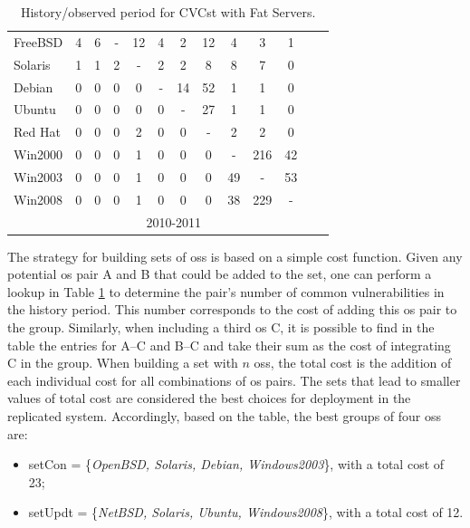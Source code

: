\begin{table}[!ht]
\begin{center}
{\begin{tabular}{|l|c|c|c|c|c|c|c|c|c|c|c|c|}
FreeBSD & 4 & 6 & - & 12 & 4 & 2 & 12 & 4 & 3 & 1& \\ \cline{1-11}
Solaris & 1 & 1 & 2 & - & 2 & 2 & 8 & 8 & 7 & 0 &\\ \cline{1-11}
Debian & 0 & 0 & 0 & 0 & - & 14 & 52 & 1 & 1 & 0 &\\ \cline{1-11}
Ubuntu & 0 & 0 & 0 & 0 & 0 & - & 27 & 1 & 1 & 0 &\\ \cline{1-11}
Red Hat & 0 & 0 & 0 & 2 & 0 & 0 & - & 2 & 2 & 0 &\\ \cline{1-11}
Win2000 & 0 & 0 & 0 & 1 & 0 & 0 & 0 & - & 216 & 42 &\\ \cline{1-11}
Win2003 & 0 & 0 & 0 & 1 & 0 & 0 & 0 & 49 & - & 53 & \\ \cline{1-12}
Win2008 & 0 & 0 & 0 & 1 & 0 & 0 & 0 & 38 & 229 & -	& \multicolumn{1}{|c}{}  \\ \cline{1-11}
 \multicolumn{1}{c|}{}& \multicolumn{9}{|c|}{2010-2011} & \multicolumn{2}{|c}{}\\ \cline{2-10}
\end{tabular}
\caption{History/observed period for CVCst with Fat Servers.}
\label{tab:strat_i}
}
\end{center}
\end{table}

The strategy for building sets of \glspl{os} is based on a simple cost function. 
Given any potential \gls{os} pair A and B that could be added to the set, one can perform a lookup in Table \ref{tab:strat_i} to determine the pair's number of common vulnerabilities in the history period. 
This number corresponds to the cost of adding this \gls{os} pair to the group. 
Similarly, when including a third \gls{os} C, it is possible to find in the table the entries for A--C and B--C and take their sum as the cost of integrating C in the group. 
When building a set with $n$ \glspl{os}, the total cost is the addition of each individual cost for all combinations of \gls{os} pairs.
The sets that lead to smaller values of total cost are considered the best choices for deployment in the replicated system.
Accordingly, based on the table, the best groups of four \glspl{os} are:

\begin{itemize}
\item setCon = \{\emph{OpenBSD, Solaris, Debian, Windows2003}\}, with a total cost of 23;
\item setUpdt = \{\emph{NetBSD, Solaris, Ubuntu, Windows2008}\}, with a total cost of 12.%
\end{itemize}

